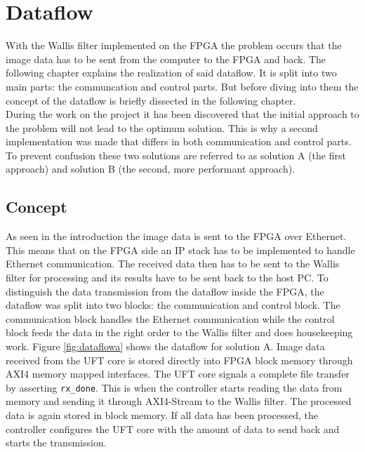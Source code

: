 %
%
\chapter{Dataflow} \label{chapt:dataflow}
With the Wallis filter implemented on the FPGA the problem occurs that the
image data has to be sent from the computer to the FPGA and back. The following
chapter explains the realization of said dataflow. It is split into two main
parts: the communcation and control parts. But before diving into them the
concept of the dataflow is briefly dissected in the following chapter.\\

During the work on the project it has been discovered that the initial approach
to
the problem will not lead to the optimum solution. This is why a second
implementation was made that differs in both communication and control parts. To
prevent confusion these two solutions are referred to as solution A (the first
approach) and solution B (the second, more performant approach).

\section{Concept} \label{ch:concept}
As seen in the introduction the image data is sent to the FPGA over Ethernet.
This means that on the FPGA side an IP stack has to be implemented to handle
Ethernet
communication. The received data then has to be sent to the Wallis filter for
processing and its results have to be sent back to the host PC. To distinguish
the
data transmission from the dataflow inside the FPGA, the dataflow was split into
two blocks: the communication and control block. The communication block handles
the Ethernet communication while the control block feeds the data in the right
order to the Wallis filter and does housekeeping work. Figure \ref{fig:dataflowa}
shows the dataflow for solution A.
\clearpage
Image data received from the UFT core is stored directly into FPGA block memory
through AXI4 memory mapped interfaces. The UFT core signals a complete file
transfer by asserting \texttt{rx\_done}. This is when the controller starts
reading the data from memory and sending it through AXI4-Stream to the Wallis
filter. The processed data is again stored in block memory. If all data has been
processed, the controller configures the UFT core with the amount of data to
send back and starts the transmission.


